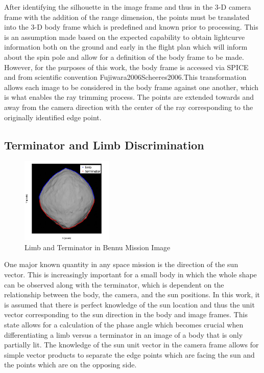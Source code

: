 After identifying the silhouette in the image frame and thus in the 3-D camera frame with the addition of the range dimension, the points must be translated into the 3-D body frame which is predefined and known prior to processing. This is an assumption made based on the expected capability to obtain lightcurve information both on the ground and early in the flight plan which will inform about the spin pole and allow for a definition of the body frame to be made. However, for the purposes of this work, the body frame is accessed via SPICE and from scientific convention {Fujiwara2006}{Scheeres2006}.This transformation allows each image to be considered in the body frame against one another, which is what enables the ray trimming process. The points are extended towards and away from the camera direction with the center of the ray corresponding to the originally identified edge point. %
\subsection{Terminator and Limb Discrimination}
\begin{figure}
    \centering
    \captionsetup{justification=centering}
    \includegraphics[width = 0.39\textwidth]{fig/limb_term_bennu_correct.jpeg}
    \caption{Limb and Terminator in Bennu Mission Image}
    \label{fig:limbwterm}
\end{figure}
One major known quantity in any space mission is the direction of the sun vector. This is increasingly important for a small body in which the whole shape can be observed along with the terminator, which is dependent on the relationship between the body, the camera, and the sun positions. In this work, it is assumed that there is perfect knowledge of the sun location and thus the unit vector corresponding to the sun direction in the body and image frames. This state allows for a calculation of the phase angle which becomes crucial when differentiating a limb versus a terminator in an image of a body that is only partially lit. The knowledge of the sun unit vector in the camera frame allows for simple vector products to separate the edge points which are facing the sun and the points which are on the opposing side. %


